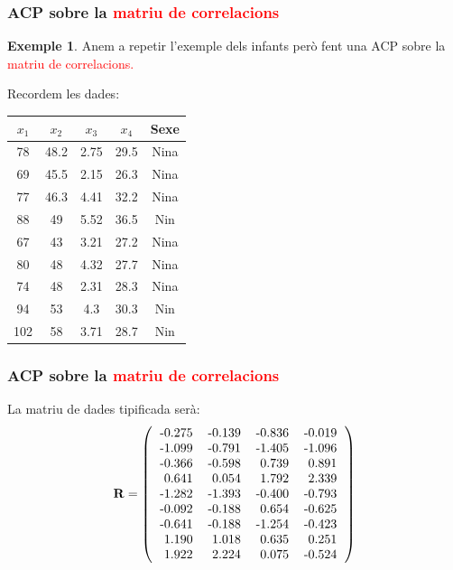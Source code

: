 \documentclass[12pt,t]{beamer}
\newcommand{\red}[1]{\textcolor{red}{#1}}
\theoremstyle{plain}
\theoremstyle{definition}
\newtheorem{exemple}{Exemple}
\begin{document}
\begin{frame}
\frametitle{ACP sobre la \red{matriu de correlacions}}
\begin{exemple}
Anem a repetir l'exemple dels infants però fent una ACP sobre la \red{matriu de correlacions.}

Recordem les dades:
{\small 
\begin{center}\begin{tabular}{|c|c|c|c|c|}\hline
$x_1$ & $x_2$ & $x_3$ & $x_4$&Sexe\\\hline
78&48.2&2.75&29.5&Nina\\ 69&45.5&2.15&26.3&Nina\\
77&46.3&4.41&32.2&Nina\\ 88&49&5.52&36.5&Nin\\ 67&43&3.21&27.2&Nina\\
80&48&4.32&27.7&Nina\\ 74&48&2.31&28.3&Nina\\ 94&53&4.3&30.3&Nin\\
102&58&3.71&28.7&Nin
\\\hline\end{tabular}\end{center}
}
\end{exemple}
\end{frame}

\begin{frame}
\frametitle{ACP sobre la \red{matriu de correlacions}}
La matriu de dades tipificada serà:
\[
{\mathbf{R}}=\left(
\begin{tabular}{rrrr}
  -0.275 & -0.139 & -0.836 & -0.019 \\ 
  -1.099 & -0.791 & -1.405 & -1.096 \\ 
  -0.366 & -0.598 & 0.739 & 0.891 \\ 
  0.641 & 0.054 & 1.792 & 2.339 \\ 
  -1.282 & -1.393 & -0.400 & -0.793 \\ 
  -0.092 & -0.188 & 0.654 & -0.625 \\ 
  -0.641 & -0.188 & -1.254 & -0.423 \\ 
  1.190 & 1.018 & 0.635 & 0.251 \\ 
  1.922 & 2.224 & 0.075 & -0.524 \\ 
  \end{tabular}\right)
\]
\end{frame}
\end{document}
